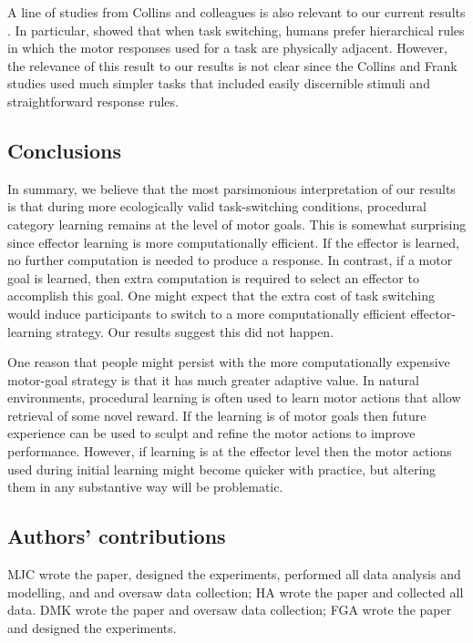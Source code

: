 \documentclass[doc, floatsintext]{apa7}
\begin{document}
A line of studies from Collins and colleagues is also relevant to our current results \parencite{collins_cognitive_2013, collins_human_2014, collins_neural_2016, collins_motor_2016, collins_cost_2017}. In particular, \textcite{collins_motor_2016} showed that when task switching, humans prefer hierarchical rules in which
the motor responses used for a task are physically adjacent. However, the relevance of this result to our results is not clear since the Collins and Frank studies used much simpler tasks that included easily discernible stimuli and straightforward response rules. 

\subsection{Conclusions}
In summary, we believe that the most parsimonious interpretation of our results is that during more ecologically valid task-switching conditions, procedural category learning remains at the level of motor goals. This is somewhat surprising since effector learning is more computationally efficient. If the effector is learned, no further computation is needed to produce a response. In contrast, if a motor goal is learned, then extra computation is required to select an effector to accomplish this goal. One might expect that the extra cost of task switching would induce participants to switch to a more computationally efficient effector-learning strategy. Our results suggest this did not happen.

One reason that people might persist with the more computationally expensive motor-goal strategy is that it has much greater adaptive value. In natural environments, procedural learning is often used to learn motor actions that allow retrieval of some novel reward. If the learning is of motor goals then future experience can be used to sculpt and refine the motor actions to improve performance. However, if learning is at the effector level then the motor actions used during initial learning might become quicker with practice, but altering them in any substantive way will be problematic.

\subsection{Authors' contributions}
MJC wrote the paper, designed the experiments, performed all data analysis and modelling, and and oversaw data collection;
HA wrote the paper and collected all data.
DMK wrote the paper and oversaw data collection;
FGA wrote the paper and designed the experiments.

\printbibliography
\end{document}
